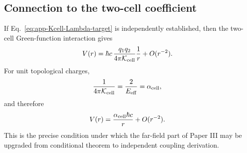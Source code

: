 \documentclass[11pt]{article}
\begin{document}
\subsection{Connection to the two-cell coefficient}

If Eq.~\eqref{eq:app-Kcell-Lambda-target} is independently established, then
the two-cell Green-function interaction gives
\begin{equation}
  V(r)
  =
  \hbar c\,
  \frac{q_1q_2}{4\pi\mathcal K_{\rm cell}}
  \frac{1}{r}
  +
  O(r^{-2}).
\end{equation}
For unit topological charges,
\begin{equation}
  \frac{1}{4\pi\mathcal K_{\rm cell}}
  =
  \frac{2}{E_{\rm eff}}
  =
  \alpha_{\rm cell},
\end{equation}
and therefore
\begin{equation}
  V(r)
  =
  \frac{\alpha_{\rm cell}\hbar c}{r}
  +
  O(r^{-2}).
\end{equation}
This is the precise condition under which the far-field part of Paper III may
be upgraded from conditional theorem to independent coupling derivation.
\end{document}
